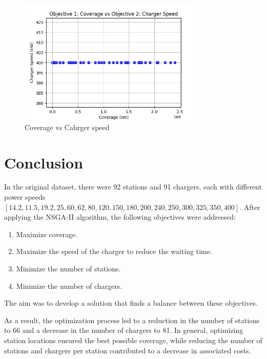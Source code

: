 \documentclass[12pt]{report}
\begin{document}
\vspace{1cm} %

\begin{figure}[h!]
    \centering
    \includegraphics[width=0.8\textwidth]{Figures/Figure_1.png}
    \caption{Coverage vs Cahrger speed}
    \label{fig:Coverage vs Cahrger speed}
\end{figure}

\chapter{Conclusion}
In the original dataset, there were 92 stations and 91 chargers, each with different power speeds \([14.2, 11.5, 19.2, 25, 60, 62, 80, 120, 150, 180, 200, 240, 250, 300, 325, 350, 400]\). After applying the NSGA-II algorithm, the following objectives were addressed:

\begin{enumerate}
    \item Maximize coverage.
    \item Maximize the speed of the charger to reduce the waiting time.
    \item Minimize the number of stations.
    \item Minimize the number of chargers.
\end{enumerate}

The aim was to develop a solution that finds a balance between these objectives.

As a result, the optimization process led to a reduction in the number of stations to 66 and a decrease in the number of chargers to 81. In general, optimizing station locations ensured the best possible coverage, while reducing the number of stations and chargers per station contributed to a decrease in associated costs.
\end{document}
